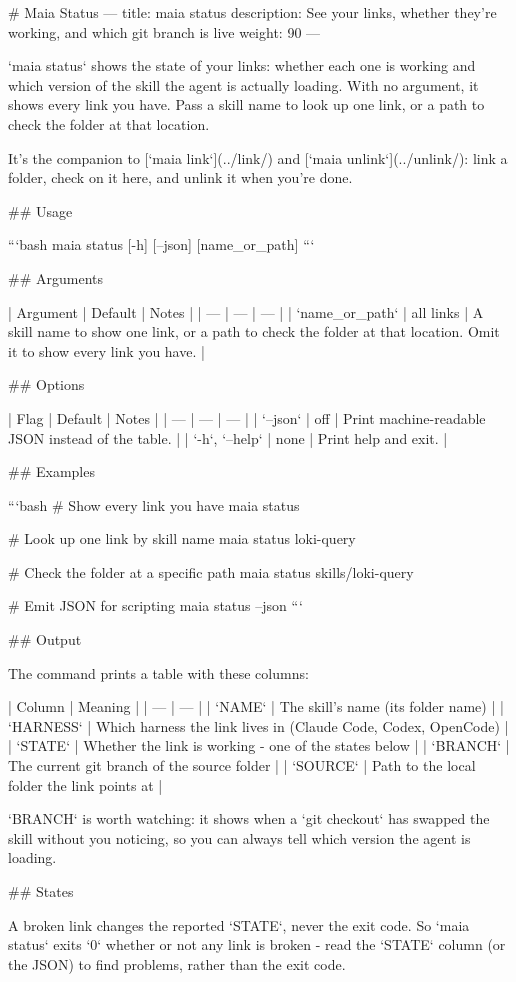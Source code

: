 # Maia Status
---
title: maia status
description: See your links, whether they're working, and which git branch is live
weight: 90
---

`maia status` shows the state of your links: whether each one is working and which version of the skill the agent is actually loading.
With no argument, it shows every link you have.
Pass a skill name to look up one link, or a path to check the folder at that location.

It's the companion to [`maia link`](../link/) and [`maia unlink`](../unlink/): link a folder, check on it here, and unlink it when you're done.

## Usage

```bash
maia status [-h] [--json] [name_or_path]
```

## Arguments

| Argument | Default | Notes |
| --- | --- | --- |
| `name_or_path` | all links | A skill name to show one link, or a path to check the folder at that location. Omit it to show every link you have. |

## Options

| Flag | Default | Notes |
| --- | --- | --- |
| `--json` | off | Print machine-readable JSON instead of the table. |
| `-h`, `--help` | none | Print help and exit. |

## Examples

```bash
# Show every link you have
maia status

# Look up one link by skill name
maia status loki-query

# Check the folder at a specific path
maia status skills/loki-query

# Emit JSON for scripting
maia status --json
```

## Output

The command prints a table with these columns:

| Column | Meaning |
| --- | --- |
| `NAME` | The skill's name (its folder name) |
| `HARNESS` | Which harness the link lives in (Claude Code, Codex, OpenCode) |
| `STATE` | Whether the link is working - one of the states below |
| `BRANCH` | The current git branch of the source folder |
| `SOURCE` | Path to the local folder the link points at |

`BRANCH` is worth watching: it shows when a `git checkout` has swapped the skill without you noticing, so you can always tell which version the agent is loading.

## States

A broken link changes the reported `STATE`, never the exit code.
So `maia status` exits `0` whether or not any link is broken - read the `STATE` column (or the JSON) to find problems, rather than the exit code.

